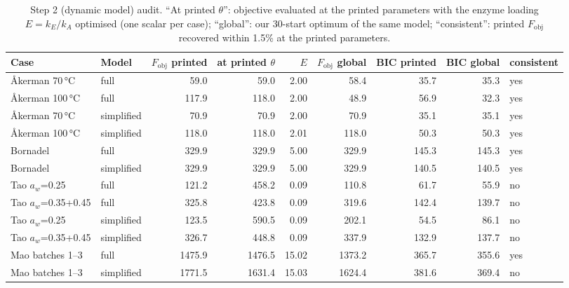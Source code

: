 \begin{table}[t]
\centering
\caption{Step 2 (dynamic model) audit. ``At printed $\theta$'': objective evaluated at the printed parameters with the enzyme loading $E=k_E/k_A$ optimised (one scalar per case); ``global'': our 30-start optimum of the same model; ``consistent'': printed $F_\mathrm{obj}$ recovered within 1.5\% at the printed parameters.}\label{tab:reprodyn}
\footnotesize
\begin{adjustbox}{max width=\linewidth}
\begin{tabular}{llrrrrrrl}
\toprule
Case & Model & $F_\mathrm{obj}$ printed & at printed $\theta$ & $E$ & $F_\mathrm{obj}$ global & BIC printed & BIC global & consistent \\
\midrule
Åkerman 70\,°C & full & 59.0 & 59.0 & 2.00 & 58.4 & 35.7 & 35.3 & yes \\
Åkerman 100\,°C & full & 117.9 & 118.0 & 2.00 & 48.9 & 56.9 & 32.3 & yes \\
Åkerman 70\,°C & simplified & 70.9 & 70.9 & 2.00 & 70.9 & 35.1 & 35.1 & yes \\
Åkerman 100\,°C & simplified & 118.0 & 118.0 & 2.01 & 118.0 & 50.3 & 50.3 & yes \\
Bornadel & full & 329.9 & 329.9 & 5.00 & 329.9 & 145.3 & 145.3 & yes \\
Bornadel & simplified & 329.9 & 329.9 & 5.00 & 329.9 & 140.5 & 140.5 & yes \\
Tao $a_w$=0.25 & full & 121.2 & 458.2 & 0.09 & 110.8 & 61.7 & 55.9 & no \\
Tao $a_w$=0.35+0.45 & full & 325.8 & 423.8 & 0.09 & 319.6 & 142.4 & 139.7 & no \\
Tao $a_w$=0.25 & simplified & 123.5 & 590.5 & 0.09 & 202.1 & 54.5 & 86.1 & no \\
Tao $a_w$=0.35+0.45 & simplified & 326.7 & 448.8 & 0.09 & 337.9 & 132.9 & 137.7 & no \\
Mao batches 1--3 & full & 1475.9 & 1476.5 & 15.02 & 1373.2 & 365.7 & 355.6 & yes \\
Mao batches 1--3 & simplified & 1771.5 & 1631.4 & 15.03 & 1624.4 & 381.6 & 369.4 & no \\
\bottomrule
\end{tabular}
\end{adjustbox}
\end{table}
